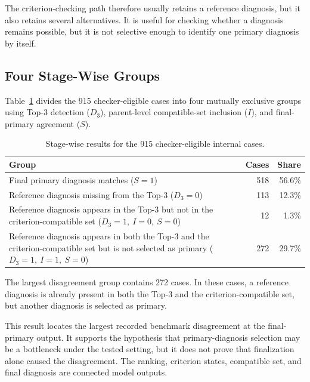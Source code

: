 \documentclass[12pt,a4paper,oneside]{report}
\begin{document}
The criterion-checking path therefore usually retains a reference
diagnosis, but it also retains several alternatives. It is useful for
checking whether a diagnosis remains possible, but it is not selective
enough to identify one primary diagnosis by itself.

\subsection{Four Stage-Wise Groups}

Table~\ref{tab:d3rs-joint} divides the 915 checker-eligible cases into
four mutually exclusive groups using Top-3 detection ($D_3$),
parent-level compatible-set inclusion ($I$), and final-primary agreement
($S$).

\begin{table}[htbp]
\centering
\caption{Stage-wise results for the 915 checker-eligible internal cases.}
\label{tab:d3rs-joint}
\small
\renewcommand{\arraystretch}{1.12}
\begin{tabularx}{\textwidth}
{|>{\raggedright\arraybackslash}X|r|r|}
\hline
\textbf{Group} & \textbf{Cases} & \textbf{Share}\\
\hline
Final primary diagnosis matches
($S=1$) &
518 &
56.6\%\\
\hline
Reference diagnosis missing from the Top-3
($D_3=0$) &
113 &
12.3\%\\
\hline
Reference diagnosis appears in the Top-3 but not in the
criterion-compatible set
($D_3=1,\ I=0,\ S=0$) &
12 &
1.3\%\\
\hline
Reference diagnosis appears in both the Top-3 and the
criterion-compatible set but is not selected as primary
($D_3=1,\ I=1,\ S=0$) &
272 &
29.7\%\\
\hline
\end{tabularx}
\renewcommand{\arraystretch}{1.0}
\end{table}

The largest disagreement group contains 272 cases. In these cases, a
reference diagnosis is already present in both the Top-3 and the
criterion-compatible set, but another diagnosis is selected as primary.

This result locates the largest recorded benchmark disagreement at the
final-primary output. It supports the hypothesis that primary-diagnosis
selection may be a bottleneck under the tested setting, but it does not
prove that finalization alone caused the disagreement. The ranking,
criterion states, compatible set, and final diagnosis are connected
model outputs.
\end{document}
